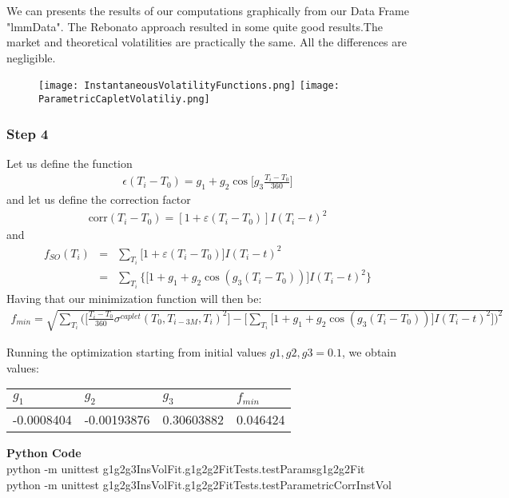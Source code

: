 \documentclass[11pt]{article}
\numberwithin{equation}{subsection}
\begin{document}
We can presents the results of our computations graphically from our Data Frame "lmmData". The Rebonato approach resulted in some quite good results.The market and theoretical volatilities are practically the same. All the differences are negligible.
\begin{figure}[H]
	\texttt{[image: InstantaneousVolatilityFunctions.png]}
	\texttt{[image: ParametricCapletVolatiliy.png]}
\end{figure}
\subsubsection*{Step 4}

Let us define the function
\begin{eqnarray*}
	\epsilon(T_i-T_0) = g_1 + g_2 \cos\bigg[g_3\frac{T_i-T_0}{360} \bigg]
\end{eqnarray*}
and let us define the correction factor 
\begin{eqnarray*}
	\text{corr}(T_i-T_0) = [1 + \varepsilon(T_i-T_0)] I(T_i-t)^2
\end{eqnarray*}
and 
\begin{eqnarray*}
	f_{SO}(T_i) &=& \sum_{T_i} \big[1 + \varepsilon(T_i-T_0) \big] I(T_i-t)^2 \\ 
	&=& \sum_{T_i} \Big\{ \big[1 + g_1 + g_2 \cos(g_3(T_i-T_0)) \big] I(T_i-t)^2 \Big\} 
\end{eqnarray*}
Having that our minimization function will then be:
\begin{eqnarray*}
	f_{min} = \sqrt{\sum_{T_i}\bigg(\bigg[\frac{T_i-T_0}{360} \sigma^{caplet}(T_0, T_{i-3M}, T_i)^2 \bigg] - \bigg[\sum_{T_i} \big[1 + g_1 + g_2 \cos(g_3(T_i-T_0)) \big] I(T_i-t)^2 \bigg] \bigg)^2}
\end{eqnarray*}

Running the optimization starting from initial values \(g1, g2, g3 = 0.1\), we obtain values:
\vskip 0.2cm 		
{
	\begin{center}
		\begin{tabular}{llll}
			\hline
			\(g_1\)   & \(g_2\)  & \(g_3\)  & \(f_{min}\) \\
			\hline
			-0.0008404  & -0.00193876  & 0.30603882 & 0.046424\\			
			\hline				 				
		\end{tabular}
	\end{center}
}
\vskip 0.4cm

\textbf{Python Code} \\
\small{python -m unittest g1g2g3InsVolFit.g1g2g2FitTests.testParamsg1g2g2Fit} \\
\small{python -m unittest g1g2g3InsVolFit.g1g2g2FitTests.testParametricCorrInstVol}\\			
\end{document}
